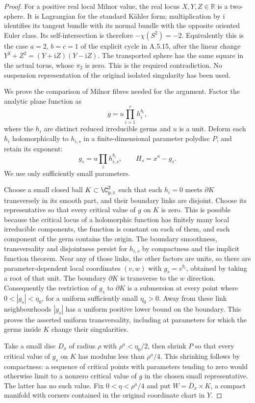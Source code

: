 \begin{proof}
For a positive real local Milnor value, the real
locus $X,Y,Z\in\mathbb R$ is a two-sphere. It is
Lagrangian for the standard K\"ahler form; multiplication
by $\mathrm i$ identifies its tangent bundle with
its normal bundle with the opposite oriented Euler
class. Its self-intersection is therefore
$-\chi(S^2)=-2$. Equivalently this is the case
$a=2$, $b=c=1$ of the explicit cycle in A.5.15,
after the linear change $Y^2+Z^2=(Y+\mathrm iZ)(Y-\mathrm iZ)$.
The transported sphere has the same square in the
actual torus, whose $\pi_2$ is zero. This is the
required contradiction. No suspension representation
of the original isolated singularity has been used.

We prove the comparison of Milnor fibres needed for
the argument. Factor the analytic plane function as
\[
                   g=u\prod_{i=1}^r h_i^{b_i},
\]
where the $h_i$ are distinct reduced irreducible
germs and $u$ is a unit. Deform each $h_i$
holomorphically to $h_{i,s}$ in a finite-dimensional
parameter polydisc $P$, and retain its exponent:
\[
 g_s=u\prod_i h_{i,s}^{b_i},\qquad
 H_s=x^a-g_s.                                    \tag{A.J.39}
\]
We use only sufficiently small parameters.

Choose a small closed ball $K\subset\C^2_{y,z}$
such that each $h_i=0$ meets $\partial K$
transversely in its smooth part, and their boundary
links are disjoint. Choose its representative so
that every critical value of $g$ on $K$ is zero.
This is possible because the critical locus of a
holomorphic function has finitely many local
irreducible components, the function is constant
on each of them, and each component of the germ
contains the origin. The boundary smoothness,
transversality and disjointness persist for
$h_{i,s}$ by compactness and the implicit function
theorem. Near any of those links, the other factors
are units, so there are parameter-dependent local
coordinates $(v,w)$ with $g_s=v^{b_i}$, obtained
by taking a root of that unit. The boundary
$\partial K$ is transverse to the $w$ direction.
Consequently the restriction of $g_s$ to
$\partial K$ is a submersion at every point where
$0<|g_s|<\eta_0$, for a uniform sufficiently small
$\eta_0>0$. Away from these link neighbourhoods
$|g_s|$ has a uniform positive lower bound on the
boundary. This proves the asserted uniform
transversality, including at parameters for which
the germs inside $K$ change their singularities.

Take a small disc $D_x$ of radius $\rho$ with
$\rho^a<\eta_0/2$, then shrink $P$ so that every
critical value of $g_s$ on $K$ has modulus less than
$\rho^a/4$. This shrinking follows by compactness:
a sequence of critical points with parameters
tending to zero would otherwise limit to a
nonzero critical value of $g$ in the chosen small
representative. The latter has no such value.
Fix $0<\eta<\rho^a/4$ and put
$W=\overline D_x\times K$, a compact manifold
with corners contained in the original coordinate
chart in $Y$.


\end{proof}
